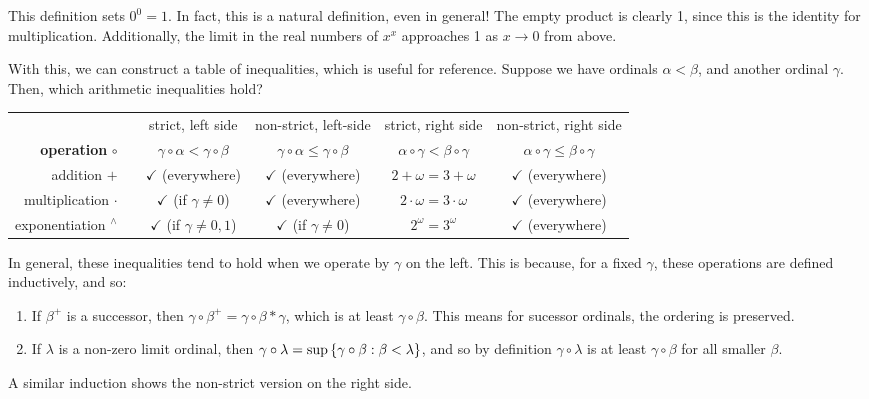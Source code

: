 \documentclass{article}
\begin{document}
\begin{note}
	This definition sets $0^0 = 1$. In fact, this is a natural definition, even in general! The empty product is clearly 1, since this is the identity for multiplication. Additionally, the limit in the real numbers of $x^x$ approaches 1 as $x \to 0$ from above.
\end{note}

With this, we can construct a table of inequalities, which is useful for reference. Suppose we have ordinals $\alpha < \beta$, and another ordinal $\gamma$. Then, which arithmetic inequalities hold?

\renewcommand{\arraystretch}{1.6}

\begin{table}[h!]
\small{
\begin{center}

\begin{tabular}{|r|c|c|c|c|c|}
\hline
& \!\!\!\!\!\! & strict, left side & non-strict, left-side & strict, right side & non-strict, right side \\
\textbf{operation} $\circ$ & \!\!\!\!\!\!
& $\gamma \circ \alpha < \gamma \circ \beta$
& $\gamma \circ \alpha \leq \gamma \circ \beta$
& $\alpha \circ \gamma < \beta \circ \gamma$
& $\alpha \circ \gamma \leq \beta \circ \gamma$ \\
\hline
addition $+$ & \!\!\!\!\!\! &
{\color{green_dark} $\checkmark$} (everywhere) &
{\color{green_dark} $\checkmark$} (everywhere) &
{\color{red_dark} $2 + \omega = 3 + \omega$} &
{\color{green_dark} $\checkmark$} (everywhere) \\ \hline
multiplication $\cdot$ & \!\!\!\!\!\! &
{\color{green_dark} $\checkmark$} (if $\gamma \neq 0$) &
{\color{green_dark} $\checkmark$} (everywhere) &
{\color{red_dark} $2 \cdot \omega = 3 \cdot \omega$} &
{\color{green_dark} $\checkmark$} (everywhere) \\ \hline
exponentiation $^\land$ & \!\!\!\!\!\! &
{\color{green_dark} $\checkmark$} (if $\gamma \neq 0, 1$) &
{\color{green_dark} $\checkmark$} (if $\gamma \neq 0$) &
{\color{red_dark} $2^\omega = 3^\omega$} &
{\color{green_dark} $\checkmark$} (everywhere) \\ \hline
\end{tabular}
\end{center}
}
\end{table}

In general, these inequalities tend to hold when we operate by $\gamma$ on the left. This is because, for a fixed $\gamma$, these operations are defined inductively, and so:
\begin{enumerate}
    \item If $\beta^+$ is a successor, then $\gamma \circ \beta^+ = \gamma \circ \beta * \gamma$, which is at least $\gamma \circ \beta$. This means for sucessor ordinals, the ordering is preserved.
    \item If $\lambda$ is a non-zero limit ordinal, then $\gamma \circ \lambda = \sup \left\lbrace \gamma \circ \beta : \beta < \lambda \right\rbrace$, and so by definition $\gamma \circ \lambda$ is at least $\gamma \circ \beta$ for all smaller $\beta$.
\end{enumerate}
A similar induction shows the non-strict version on the right side.
\end{document}
